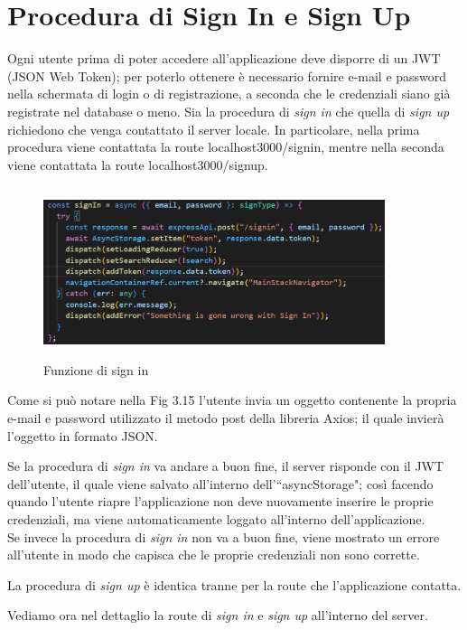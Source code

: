 \section{Procedura di Sign In e Sign Up}
Ogni utente prima di poter accedere all'applicazione deve disporre di un JWT (JSON Web Token); per poterlo ottenere \`e necessario fornire
e-mail e password nella schermata di login o di registrazione, a seconda che le credenziali siano gi\`a registrate nel database o meno.
Sia la procedura di \textit{sign in}  che quella di \textit{sign up} richiedono che venga contattato il server locale. In particolare, nella prima procedura viene 
contattata la route localhost3000/signin, mentre nella seconda viene contattata la route localhost3000/signup.
\begin{figure}[h]
    \centering
    \includegraphics[width=10cm, height=5cm]{images/signInApplication.png}
    \caption[differenzeiteot]{Funzione di sign in}
    \label{fig:sign in}
\end{figure}

Come si pu\`o notare nella Fig 3.15 l'utente invia un oggetto contenente la propria e-mail e password utilizzato il metodo post della libreria Axios;
il quale invier\`a l'oggetto in formato JSON.

Se la procedura di \textit{sign in} va andare a buon fine, il server risponde con il JWT dell'utente, il quale viene salvato all'interno dell'``asyncStorage"; cos\`i facendo quando l'utente riapre
l'applicazione non deve nuovamente inserire le proprie credenziali, ma viene automaticamente loggato all'interno dell'applicazione.\\
Se invece la procedura di \textit{sign in} non va a buon fine, viene mostrato un errore all'utente in modo che capisca che le proprie credenziali non sono corrette.

La procedura di \textit{sign up} \`e identica tranne per la route che l'applicazione contatta.

Vediamo ora nel dettaglio la route di \textit{sign in} e \textit{sign up} all'interno del server.
